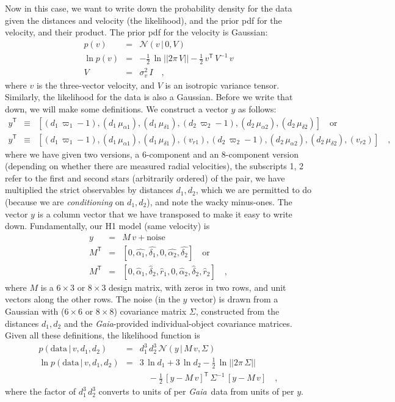 \documentclass[manuscript, letterpaper]{aastex6}
\newcommand{\project}[1]{\textsl{#1}}
\newcommand{\gaia}{\project{Gaia}}
\newcommand{\given}{\,|\,}
\newcommand{\normal}{{\mathcal{N}}}
\newcommand{\transp}[1]{{#1}^{\!\mathsf{T}}}
\newcommand{\inv}[1]{{#1}^{-1}}
\newcommand{\data}{\mathrm{data}}
\begin{document}
Now in this case, we want to write down the probability density for the data
given the distances and velocity (the likelihood), and the prior pdf for
the velocity, and their product.
The prior pdf for the velocity is Gaussian:
\begin{eqnarray}
  p(v) &=& \normal(v\given 0,V)
  \\
  \ln p(v) &=& -\frac{1}{2}\,\ln||2\pi\,V|| -\frac{1}{2}\,\transp{v}\,\inv{V}\,v
  \\
  V &=& \sigma_v^2\,I
  \quad ,
\end{eqnarray}
where $v$ is the three-vector velocity, and $V$ is an isotropic
variance tensor.
Similarly, the likelihood for the data is also a Gaussian.
Before we write that down, we will make some definitions.
We construct a vector $y$ as follows:
\begin{eqnarray}
  \transp{y} &\equiv& [(d_1\,\varpi_1 - 1), (d_1\,\mu_{\alpha1}), (d_1\,\mu_{\delta1}),
                       (d_2\,\varpi_2 - 1), (d_2\,\mu_{\alpha2}), (d_2\,\mu_{\delta2})] \quad \mbox{or}
  \\
  \transp{y} &\equiv& [(d_1\,\varpi_1 - 1), (d_1\,\mu_{\alpha1}), (d_1\,\mu_{\delta1}), (v_{r1}),
                       (d_2\,\varpi_2 - 1), (d_2\,\mu_{\alpha2}), (d_2\,\mu_{\delta2}), (v_{r2})]
  \quad ,
\end{eqnarray}
where we have given two versions, a 6-component and an 8-component
version (depending on whether there are measured radial velocities),
the subscripts 1, 2 refer to the first and second stars (arbitrarily
ordered) of the pair, we have multiplied the strict observables by
distances $d_1, d_2$, which we are permitted to do (because we are
\emph{conditioning} on $d_1, d_2$), and note the wacky minus-ones.
The vector $y$ is a column vector that we have transposed to make it
easy to write down.
Fundamentally, our H1 model (same velocity) is
\begin{eqnarray}
  y &=& M\,v + \mathrm{noise}
  \\
  \transp{M} &=& [0, \hat{\alpha_1}, \hat{\delta_1},
                  0, \hat{\alpha_2}, \hat{\delta_2}] \quad \mbox{or}
  \\
  \transp{M} &=& [0, \hat{\alpha}_1, \hat{\delta}_2, \hat{r}_1,
                  0, \hat{\alpha}_2, \hat{\delta}_2, \hat{r}_2]
  \quad,
\end{eqnarray}
where $M$ is a $6\times 3$ or $8\times 3$ design matrix, with zeros
in two rows, and unit vectors along the other rows.
The noise (in the $y$ vector) is drawn from a Gaussian with ($6\times 6$ or $8\times 8$)
covariance matrix $\Sigma$, constructed from the distances $d_1, d_2$ and
the \gaia-provided individual-object covariance matrices.
Given all these definitions, the likelihood function is
\begin{eqnarray}
  p(\data\given v,d_1,d_2) &=& d_1^3\,d_2^3\,\normal(y\given M\,v, \Sigma)
  \\
  \ln p(\data\given v,d_1,d_2) &=& 3\,\ln d_1 + 3\,\ln d_2
  -\frac{1}{2}\,\ln||2\pi\,\Sigma|| \nonumber \\ && \quad
  -\frac{1}{2}\,\transp{[y-M\,v]}\,\inv{\Sigma}\,[y-M\,v]
  \quad ,
\end{eqnarray}
where the factor of $d_1^3\,d_2^3$ converts to units of per \gaia\ data
from units of per $y$.
\end{document}
